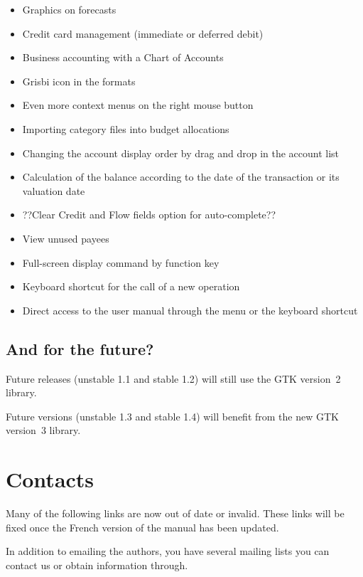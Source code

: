 \begin{itemize}%
	\item Graphics on forecasts
	\item Credit card management (immediate or deferred debit)
	\item Business accounting with a Chart of Accounts
	\item Grisbi icon in the   formats 
	\item Even more context menus on the right mouse button
	\item Importing category files into budget allocations
	\item Changing the account display order by drag and drop in the account list
	\item Calculation of the balance according to the date of the transaction or its valuation date
	\item ??Clear Credit and Flow fields option for auto-complete??
	\item View unused payees
	\item Full-screen display command by function key 
	\item Keyboard shortcut   for the call of a new operation
	\item Direct access to the user manual through the menu  or the keyboard shortcut  
\end{itemize}

\subsection{And for the future?}

Future releases (unstable 1.1 and stable 1.2) will still use the \gls{GTK} version~2 library.

Future versions (unstable 1.3 and stable 1.4) will benefit from the new GTK version~3 library.

\section{Contacts\label{introduction-contacts}}

 Many of the following links are now out of date or invalid.  These links will be fixed once the French version of the manual has been updated.

In addition to emailing the authors, you have several mailing lists you can contact us or obtain information through.

